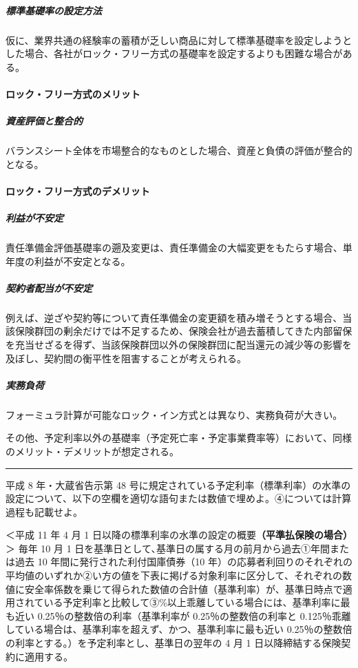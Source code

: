 \documentclass[report,gutter=10mm,fore-edge=10mm,uplatex,dvipdfmx]{jlreq}
\begin{document}
\subparagraph{標準基礎率の設定方法}

仮に、業界共通の経験率の蓄積が乏しい商品に対して標準基礎率を設定しようとした場合、各社がロック・フリー方式の基礎率を設定するよりも困難な場合がある。

\paragraph{ロック・フリー方式のメリット}

\subparagraph{資産評価と整合的}

バランスシート全体を市場整合的なものとした場合、資産と負債の評価が整合的となる。

\paragraph{ロック・フリー方式のデメリット}

\subparagraph{利益が不安定}

責任準備金評価基礎率の遡及変更は、責任準備金の大幅変更をもたらす場合、単年度の利益が不安定となる。

\subparagraph{契約者配当が不安定}

例えば、逆ざや契約等について責任準備金の変更額を積み増そうとする場合、当該保険群団の剰余だけでは不足するため、保険会社が過去蓄積してきた内部留保を充当せざるを得ず、当該保険群団以外の保険群団に配当還元の減少等の影響を及ぼし、契約間の衡平性を阻害することが考えられる。

\subparagraph{実務負荷}

フォーミュラ計算が可能なロック・イン方式とは異なり、実務負荷が大きい。

その他、予定利率以外の基礎率（予定死亡率・予定事業費率等）において、同様のメリット・デメリットが想定される。

\begin{center}\rule{0.5\linewidth}{0.5pt}\end{center}


平成 8 年・大蔵省告示第 48
号に規定されている予定利率（標準利率）の水準の設定について、以下の空欄を適切な語句または数値で埋めよ。④については計算過程も記載せよ。

＜平成 11 年 4 月 1
日以降の標準利率の水準の設定の概要\textbf{（平準払保険の場合）}＞ 毎年
10 月 1 日を基準日として､基準日の属する月の前月から過去①年間または過去
10 年間に発行された利付国庫債券（10
年）の応募者利回りのそれぞれの平均値のいずれか②い方の値を下表に掲げる対象利率に区分して、それぞれの数値に安全率係数を乗じて得られた数値の合計値（基準利率）が、基準日時点で適用されている予定利率と比較して③\%以上乖離している場合には、基準利率に最も近い
0.25％の整数倍の利率（基準利率が 0.25％の整数倍の利率と
0.125％乖離している場合は、基準利率を超えず、かつ、基準利率に最も近い
0.25％の整数倍の利率とする。）を予定利率とし、基準日の翌年の 4 月 1
日以降締結する保険契約に適用する。
\end{document}
